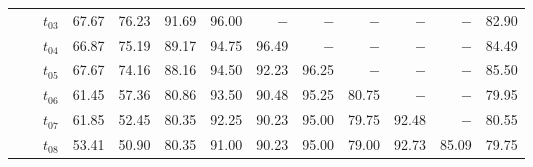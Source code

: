 \begin{table}[ht]
\begin{tabular}{@{}l l l *{10}{r}@{}}
 & & $t_{03}$ & 67.67 & 76.23 & 91.69 & 96.00 & $-$ & $-$ & $-$ & $-$ & $-$ & 82.90 \\
 & & $t_{04}$ & 66.87 & 75.19 & 89.17 & 94.75 & 96.49 & $-$ & $-$ & $-$ & $-$ & 84.49 \\
 & & $t_{05}$ & 67.67 & 74.16 & 88.16 & 94.50 & 92.23 & 96.25 & $-$ & $-$ & $-$ & 85.50 \\
 & & $t_{06}$ & 61.45 & 57.36 & 80.86 & 93.50 & 90.48 & 95.25 & 80.75 & $-$ & $-$ & 79.95 \\
 & & $t_{07}$ & 61.85 & 52.45 & 80.35 & 92.25 & 90.23 & 95.00 & 79.75 & 92.48 & $-$ & 80.55 \\
 & & $t_{08}$ & 53.41 & 50.90 & 80.35 & 91.00 & 90.23 & 95.00 & 79.00 & 92.73 & 85.09 & 79.75 \\
\bottomrule
\end{tabular}
\end{table}

